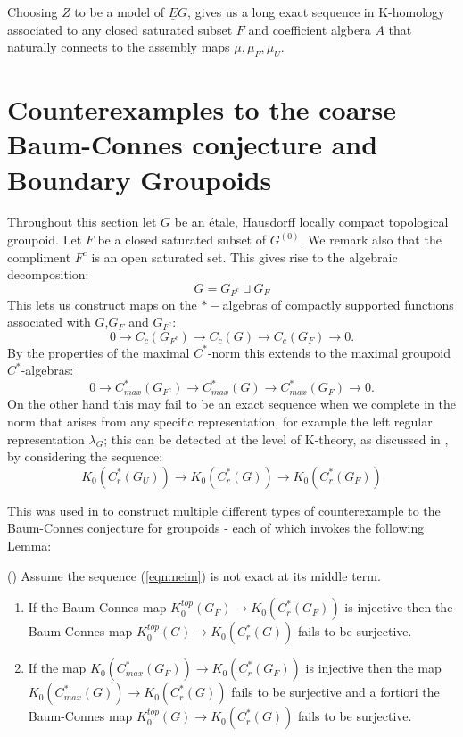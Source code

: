 Choosing $Z$ to be a model of $\underline{E}G$, gives us a long exact sequence in K-homology associated to any closed saturated subset $F$ and coefficient algbera $A$ that naturally connects to the assembly maps $\mu, \mu_{F}, \mu_{U}$.

\section{Counterexamples to the coarse Baum-Connes conjecture and Boundary Groupoids}\label{Sect:CE}

Throughout this section let $G$ be an \'etale, Hausdorff locally compact topological groupoid. Let $F$ be a closed saturated subset of $G^{(0)}$. We remark also that the compliment $F^{c}$ is an open saturated set. This gives rise to the algebraic decomposition:
\begin{equation*}
G = G_{F^{c}}\sqcup G_{F}
\end{equation*}
This lets us construct maps on the $*-$algebras of compactly supported functions associated with $G$,$G_{F}$ and $G_{F^{c}}$:
\begin{equation*}
0 \rightarrow C_{c}(G_{F^{c}}) \rightarrow C_{c}(G) \rightarrow C_{c}(G_{F}) \rightarrow 0.
\end{equation*}
By the properties of the maximal $C^{*}$-norm this extends to the maximal groupoid $C^{*}$-algebras:
\begin{equation*}
0 \rightarrow C_{max}^{*}(G_{F^{c}}) \rightarrow C_{max}^{*}(G) \rightarrow C_{max}^{*}(G_{F}) \rightarrow 0.
\end{equation*}
On the other hand this may fail to be an exact sequence when we complete in the norm that arises from any specific representation, for example the left regular representation $\lambda_{G}$; this can be detected at the level of K-theory, as discussed in \cite{MR1911663}, by considering the sequence:
\begin{equation}\label{eqn:neim}
K_{0}(C^{*}_{r}(G_{U}))\rightarrow K_{0}(C^{*}_{r}(G)) \rightarrow K_{0}(C^{*}_{r}(G_{F}))
\end{equation}

This was used in \cite{MR1911663} to construct multiple different types of counterexample to the Baum-Connes conjecture for groupoids - each of which invokes the following Lemma:
\begin{lemma}\label{Lem:Lemma1}(\cite[Lemma 1]{MR1911663})
Assume the sequence (\ref{eqn:neim}) is not exact at its middle term.
\begin{enumerate}
\item If the Baum-Connes map $K_{0}^{top}(G_{F}) \rightarrow K_{0}(C^{*}_{r}(G_{F}))$ is injective then the Baum-Connes map $K_{0}^{top}(G) \rightarrow K_{0}(C^{*}_{r}(G))$ fails to be surjective.
\item If the map $K_{0}(C^{*}_{max}(G_{F})) \rightarrow K_{0}(C^{*}_{r}(G_{F}))$ is injective then the map $K_{0}(C^{*}_{max}(G)) \rightarrow K_{0}(C^{*}_{r}(G))$ fails to be surjective and a fortiori the Baum-Connes map $K_{0}^{top}(G) \rightarrow K_{0}(C^{*}_{r}(G))$ fails to be surjective.
\end{enumerate}
\end{lemma}

